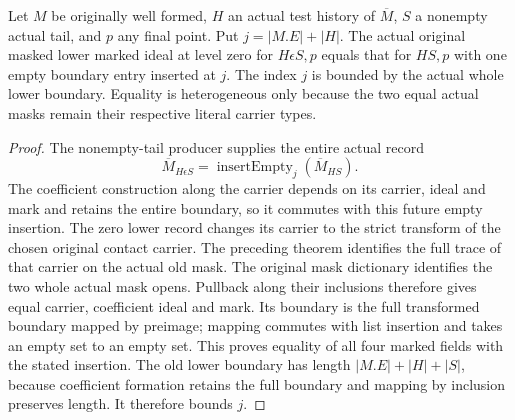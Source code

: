 \begin{theorem}
\label{hir:original-interior-actual-zero-lower-record}
\leanok
{}
Let $M$ be originally well formed, $H$ an actual test history of $\overline M$,
$S$ a nonempty actual tail, and $p$ any final point.  Put
$j=|M.E|+|H|$.  The actual original masked lower marked ideal at level zero
for $H\epsilon S,p$ equals that for $HS,p$ with one empty boundary entry
inserted at $j$.  The index $j$ is bounded by the actual whole lower boundary.
Equality is heterogeneous only because the two equal actual masks remain
their respective literal carrier types.
\end{theorem}
\begin{proof}
The nonempty-tail producer supplies the entire actual record
\[
 \overline M_{H\epsilon S}=\operatorname{insertEmpty}_j(\overline M_{HS}).
\]
The coefficient construction along the carrier depends on its carrier,
ideal and mark and retains the entire boundary, so it commutes with this
future empty insertion.  The zero lower record changes its carrier to the
strict transform of the chosen original contact carrier.  The preceding
theorem identifies the full trace of that carrier on the actual old mask.
The original mask dictionary identifies the two whole actual mask opens.
Pullback along their inclusions therefore gives equal carrier, coefficient
ideal and mark.  Its boundary is the full transformed boundary mapped by
preimage; mapping commutes with list insertion and takes an empty set to
an empty set.  This proves equality of all four marked fields with the
stated insertion.  The old lower boundary has length
$|M.E|+|H|+|S|$, because coefficient formation retains the full boundary
and mapping by inclusion preserves length.  It therefore bounds $j$.
\end{proof}


